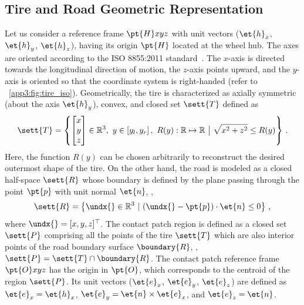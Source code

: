 \subsection{Tire and Road Geometric Representation}
\label{app3:sec:tire_road_representation}

Let us consider a reference frame $\pt{H}xyz$ with unit vectors ($\et{h}_x$, $\et{h}_y$, $\et{h}_z$),  having its origin $\pt{H}$ located at the wheel hub. The axes are oriented according to the ISO 8855:2011 standard~\cite{iso88552011}. The $x$-axis is directed towards the longitudinal direction of motion, the $z$-axis points upward, and the $y$-axis is oriented so that the coordinate system is right-handed (refer to \figurename~\ref{app3:fig:tire_iso}).  Geometrically, the tire is characterized as axially symmetric (about the axis $\et{h}_y$), convex, and closed set $\sett{T}$ defined as
%
\begin{equation*}
  \sett{T} = \left\{ \begin{bmatrix} x\\ y\\ z \end{bmatrix} \in \mathbb{R}^3, ~ y \in \left[ y_l, y_r \right], ~ R(y):\mathbb{R} \mapsto \mathbb{R} ~\big|~ \sqrt{x^2+z^2} \leq R(y) \right\} \, \text{.}
\end{equation*}
%
Here, the function $R(y)$ can be chosen arbitrarily to reconstruct the desired outermost shape of the tire. On the other hand, the road is modeled as a closed half-space $\sett{R}$ whose boundary is defined by the plane passing through the point $\pt{p}$ with unit normal $\et{n}$, \ie{},
%
\begin{equation*}
  \sett{R} = \left\{\undx{}\in\mathbb{R}^3 ~|~ (\undx{}-\pt{p})\cdot\et{n} \leq 0 \right\} \, \text{,}
\end{equation*}
%
where $\undx{} = [x,y,z]^\top$. The contact patch region is defined as a closed set $\sett{P}$ comprising all the points of the tire $\sett{T}$ which are also interior points of the road boundary surface $\boundary{R}$, \ie{}, $\sett{P} = \sett{T} \cap \boundary{R}$. The contact patch reference frame $\pt{O}xyz$ has the origin in $\pt{O}$, which corresponds to the centroid of the region $\sett{P}$. Its unit vectors ($\et{e}_x$, $\et{e}_y$, $\et{e}_z$) are defined as $\et{e}_x = \et{h}_x$, $\et{e}_y = \et{n} \times \et{e}_x$, and $\et{e}_z = \et{n}$.

